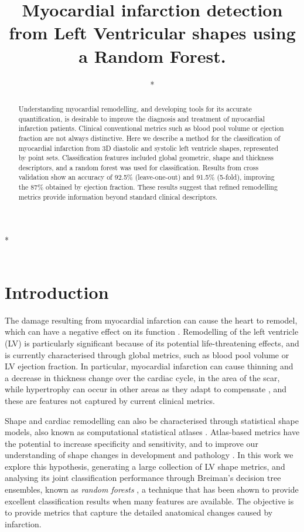 \documentclass{llncs}
\begin{document}
\title{Myocardial infarction detection from Left Ventricular shapes using a Random Forest.}

\author{*}

\institute
{*\\
\email{*}\\
}
\maketitle              %
\begin{abstract}
Understanding myocardial remodelling, and developing tools for its accurate quantification, is desirable to improve the diagnosis and treatment of myocardial infarction patients. Clinical conventional metrics such as blood pool volume or ejection fraction are not always distinctive. Here we describe a method for the classification of myocardial infarction from 3D diastolic and systolic left ventricle shapes, represented by point sets. Classification features included global geometric, shape and thickness descriptors, and a random forest was used for classification. Results from cross validation show an accuracy of 92.5\% (leave-one-out) and 91.5\% (5-fold), improving the 87\% obtained by ejection fraction. These results suggest that refined remodelling metrics provide information beyond standard clinical descriptors.

\end{abstract}
%
\section{Introduction}
The damage resulting from myocardial infarction can cause the heart to remodel, which can have a negative effect on its function \cite{Sutton2000}. Remodelling of the left ventricle (LV) is particularly significant because of its potential life-threatening effects, and is currently characterised through global metrics, such as blood pool volume or LV ejection fraction. In particular, myocardial infarction can cause thinning and a decrease in thickness change over the cardiac cycle, in the area of the scar, while hypertrophy can occur in other areas as they adapt to compensate \cite{Sutton2000}, and these are features not captured by current clinical metrics. 

 

Shape and cardiac remodelling can also be characterised through statistical shape models, also known as computational statistical atlases \cite{Cootes1992,Young2009}. Atlas-based metrics have the potential to increase  specificity and sensitivity, and to improve our understanding of shape changes in development and pathology \cite{Lewandowski2012,Lorenz2006}. In this work we explore this hypothesis, generating a large collection of LV shape metrics, and analysing its joint classification performance through Breiman's decision tree ensembles, known as \emph{random forests} \cite{Breiman2001}, a technique that has been shown to provide excellent classification results when many features are available. The objective is to provide metrics that capture the detailed anatomical changes caused by infarction.
\end{document}
